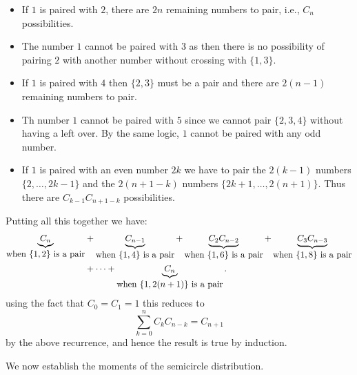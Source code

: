 \begin{itemize}
\item[1. ] If $1$ is paired with $2$, there are $2n$ remaining numbers to pair, i.e., $C_n$ possibilities.


\item[2. ] The number $1$ cannot be paired with $3$ as then there is no possibility of pairing $2$ with another number without crossing with $\{1,3\}$.


\item[3. ] If $1$ is paired with $4$ then $\{2,3\}$ must be a pair and there are $2(n-1)$ remaining numbers to pair. 


\item[4. ] Th number $1$ cannot be paired with $5$ since we cannot pair $\{2,3,4\}$ without having a left over. By the same logic, $1$ cannot be paired with any odd number.


\item[5. ] If $1$ is paired with an even number $2k$ we have to pair the $2(k-1)$ numbers $\{2,\ensuremath{\ldots},2k-1\}$ and the $2(n+1-k)$ numbers $\{2k+1,\ensuremath{\ldots},2(n+1)\}$. Thus there are $C_{k-1} C_{n+1-k}$ possibilities.

\end{itemize}
Putting all this together we have:
\begin{align*}
\underbrace{C_n}_{\hbox{when $\{1,2\}$ is a pair}} &+ 
\underbrace{C_{n-1}}_{\hbox{when $\{1,4\}$ is a pair}} + 
\underbrace{C_2 C_{n-2}}_{\hbox{when $\{1,6\}$ is a pair}} +
\underbrace{C_3 C_{n-3}}_{\hbox{when $\{1,8\}$ is a pair}} \\
& + \ensuremath{\cdots} + 
\underbrace{C_n}_{\hbox{when $\{1,2(n+1)\}$ is a pair}}.
\end{align*}
using the fact that $C_0 = C_1 = 1$ this reduces to
\[
\ensuremath{\sum}_{k=0}^n  C_k C_{n-k} = C_{n+1}
\]
by the above recurrence, and hence the result is true by induction.

We now establish the moments of the semicircle distribution. 


